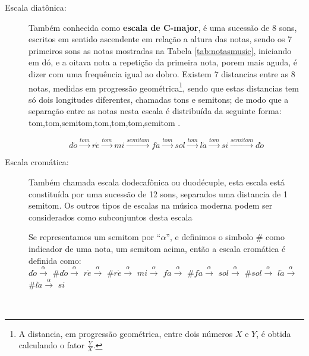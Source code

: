 \begin{description}

\item [Escala diatônica:] \label{sec:pos:Diatonica}
Também conhecida como \textbf{escala de C-major},
é uma sucessão de 8 sons,  escritos em sentido ascendente em relação a altura das notas, 
sendo os 7 primeiros sons as notas mostradas na Tabela \ref{tab:notasmusic}, iniciando em dó,
e a oitava nota a repetição da primeira nota, 
porem mais aguda, é dizer com uma frequência igual ao dobro.
Existem 7 distancias entre as 8 notas, medidas em progressão geométrica\footnote{A 
distancia, em progressão geométrica, entre dois números $X$ e $Y$, é obtida calculando o fator $\frac{Y}{X}$. }, 
sendo que estas distancias tem só dois longitudes diferentes, chamadas tons e semitons;
de modo que a separação entre as notas nesta escala é distribuída da seguinte forma: 
tom,tom,semitom,tom,tom,tom,semitom \cite[pp. 30]{cardoso1973curso}\cite[pp. 753]{apel1969harvard}.
\begin{example}
\begin{equation*}
d\acute{o}\overset{tom}{\rightarrow}
r\acute{e}\overset{tom}{\rightarrow}
mi\overset{semitom}{\rightarrow}
f\acute{a}\overset{tom}{\rightarrow}
sol\overset{tom}{\rightarrow}
l\acute{a}\overset{tom}{\rightarrow}
si\overset{semitom}{\rightarrow}
d\acute{o}
\end{equation*}
\end{example}


\item [Escala cromática:] \label{sec:pos:Cromatica}
Também chamada escala dodecafônica ou duodécuple, 
esta escala está constituída por uma sucessão de 12 sons, separados uma distancia de 1 semitom.
Os outros tipos de escalas na música moderna podem ser considerados como subconjuntos desta escala \cite[pp. 753]{apel1969harvard}
\begin{example} 
Se representamos um semitom por ``$\alpha$'', 
e definimos o simbolo $\#$ como indicador de uma nota, um semitom acima, 
então a escala cromática é definida como:\\
$d\acute{o}\overset{\alpha}{\rightarrow}$
$\#d\acute{o}\overset{\alpha}{\rightarrow}$
$r\acute{e}\overset{\alpha}{\rightarrow}$
$\#r\acute{e}\overset{\alpha}{\rightarrow}$
$mi\overset{\alpha}{\rightarrow}$
$f\acute{a}\overset{\alpha}{\rightarrow}$
$\#f\acute{a}\overset{\alpha}{\rightarrow}$
$sol\overset{\alpha}{\rightarrow}$
$\#sol\overset{\alpha}{\rightarrow}$
$l\acute{a}\overset{\alpha}{\rightarrow}$
$\#l\acute{a}\overset{\alpha}{\rightarrow}$
$si$
\end{example}

\end{description}~\\


